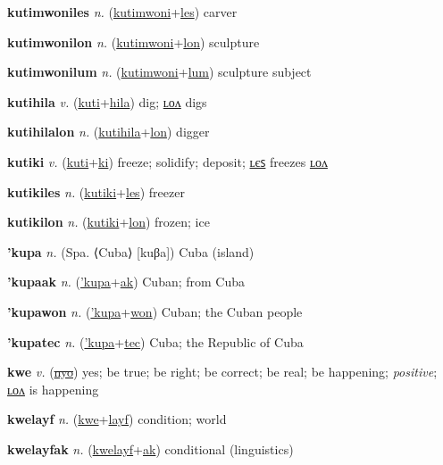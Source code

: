 \textbf{\hypertarget{kutimwoniles}{kutimwoniles}} \textit{n.} (\hyperlink{kutimwoni}{kutimwoni}+\allowbreak \hyperlink{les}{les})
carver

\textbf{\hypertarget{kutimwonilon}{kutimwonilon}} \textit{n.} (\hyperlink{kutimwoni}{kutimwoni}+\allowbreak \hyperlink{lon}{lon})
sculpture

\textbf{\hypertarget{kutimwonilum}{kutimwonilum}} \textit{n.} (\hyperlink{kutimwoni}{kutimwoni}+\allowbreak \hyperlink{lum}{lum})
sculpture subject

\textbf{\hypertarget{kutihila}{kutihila}} \textit{v.} (\hyperlink{kuti}{kuti}+\allowbreak \hyperlink{hila}{hila})
dig; \hyperlink{kutihilalon}{ʟᴏᴧ} digs

\textbf{\hypertarget{kutihilalon}{kutihilalon}} \textit{n.} (\hyperlink{kutihila}{kutihila}+\allowbreak \hyperlink{lon}{lon})
digger

\textbf{\hypertarget{kutiki}{kutiki}} \textit{v.} (\hyperlink{kuti}{kuti}+\allowbreak \hyperlink{ki}{ki})
freeze; solidify; deposit; \hyperlink{kutikiles}{ʟєꜱ} freezes \hyperlink{kutikilon}{ʟᴏᴧ}

\textbf{\hypertarget{kutikiles}{kutikiles}} \textit{n.} (\hyperlink{kutiki}{kutiki}+\allowbreak \hyperlink{les}{les})
freezer

\textbf{\hypertarget{kutikilon}{kutikilon}} \textit{n.} (\hyperlink{kutiki}{kutiki}+\allowbreak \hyperlink{lon}{lon})
frozen; ice

\textbf{\hypertarget{'kupa}{'kupa}} \textit{n.} (Spa. ⟨Cuba⟩ [kuβa])
Cuba (island)

\textbf{\hypertarget{'kupaak}{'kupaak}} \textit{n.} (\hyperlink{'kupa}{'kupa}+\allowbreak \hyperlink{ak}{ak})
Cuban; from Cuba

\textbf{\hypertarget{'kupawon}{'kupawon}} \textit{n.} (\hyperlink{'kupa}{'kupa}+\allowbreak \hyperlink{won}{won})
Cuban; the Cuban people

\textbf{\hypertarget{'kupatec}{'kupatec}} \textit{n.} (\hyperlink{'kupa}{'kupa}+\allowbreak \hyperlink{tec}{tec})
Cuba; the Republic of Cuba

\textbf{\hypertarget{kwe}{kwe}} \textit{v.} (\hyperlink{nyo}{\sout{nyo}})
yes; be true; be right; be correct; be real; be happening; \textit{positive}; \hyperlink{kwelon}{ʟᴏᴧ} is happening

\textbf{\hypertarget{kwelayf}{kwelayf}} \textit{n.} (\hyperlink{kwe}{kwe}+\allowbreak \hyperlink{layf}{layf})
condition; world

\textbf{\hypertarget{kwelayfak}{kwelayfak}} \textit{n.} (\hyperlink{kwelayf}{kwelayf}+\allowbreak \hyperlink{ak}{ak})
conditional (linguistics)


